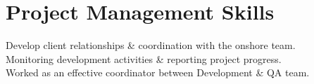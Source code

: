 \documentclass[]{deedy-resume-openfont}
\begin{document}
\begin{minipage}[t]{0.66\textwidth}



\section{Project Management Skills} 
\textbullet{} Develop client relationships \& coordination with the onshore team.\\
\textbullet{} Monitoring development activities \& reporting project progress.\\
\textbullet{} Worked as an effective coordinator between Development \& QA team.


\end{minipage} 

\end{document}
